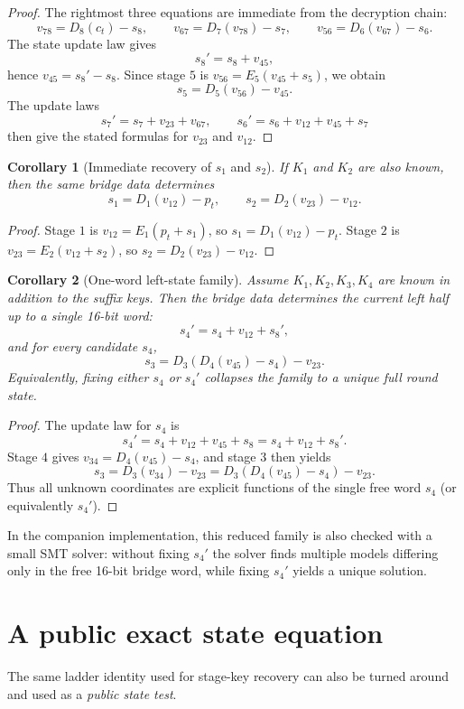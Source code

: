 \documentclass[11pt]{article}
\newtheorem{corollary}{Corollary}
\begin{document}
\begin{proof}
The rightmost three equations are immediate from the decryption chain:
\[
v_{78}=D_8(c_t)-s_8,\qquad
v_{67}=D_7(v_{78})-s_7,\qquad
v_{56}=D_6(v_{67})-s_6.
\]
The state update law gives
\[
s_8'=s_8+v_{45},
\]
hence $v_{45}=s_8'-s_8$. Since stage $5$ is $v_{56}=E_5(v_{45}+s_5)$, we obtain
\[
s_5=D_5(v_{56})-v_{45}.
\]
The update laws
\[
s_7'=s_7+v_{23}+v_{67},\qquad
s_6'=s_6+v_{12}+v_{45}+s_7
\]
then give the stated formulas for $v_{23}$ and $v_{12}$.
\end{proof}

\begin{corollary}[Immediate recovery of $s_1$ and $s_2$]
If $K_1$ and $K_2$ are also known, then the same bridge data determines
\[
s_1=D_1(v_{12})-p_t,\qquad
s_2=D_2(v_{23})-v_{12}.
\]
\end{corollary}

\begin{proof}
Stage $1$ is $v_{12}=E_1(p_t+s_1)$, so $s_1=D_1(v_{12})-p_t$. Stage $2$ is $v_{23}=E_2(v_{12}+s_2)$, so $s_2=D_2(v_{23})-v_{12}$.
\end{proof}

\begin{corollary}[One-word left-state family]
Assume $K_1,K_2,K_3,K_4$ are known in addition to the suffix keys. Then the bridge data determines the current left half up to a single 16-bit word:
\[
s_4' = s_4 + v_{12} + s_8',
\]
and for every candidate $s_4$,
\[
s_3 = D_3(D_4(v_{45})-s_4)-v_{23}.
\]
Equivalently, fixing either $s_4$ or $s_4'$ collapses the family to a unique full round state.
\end{corollary}

\begin{proof}
The update law for $s_4$ is
\[
s_4' = s_4 + v_{12} + v_{45} + s_8 = s_4 + v_{12} + s_8'.
\]
Stage $4$ gives $v_{34}=D_4(v_{45})-s_4$, and stage $3$ then yields
\[
s_3=D_3(v_{34})-v_{23}=D_3(D_4(v_{45})-s_4)-v_{23}.
\]
Thus all unknown coordinates are explicit functions of the single free word $s_4$ (or equivalently $s_4'$).
\end{proof}

In the companion implementation, this reduced family is also checked with a small SMT solver: without fixing $s_4'$ the solver finds multiple models differing only in the free 16-bit bridge word, while fixing $s_4'$ yields a unique solution.

\section{A public exact state equation}
The same ladder identity used for stage-key recovery can also be turned around and used as a \emph{public state test}.
\end{document}
